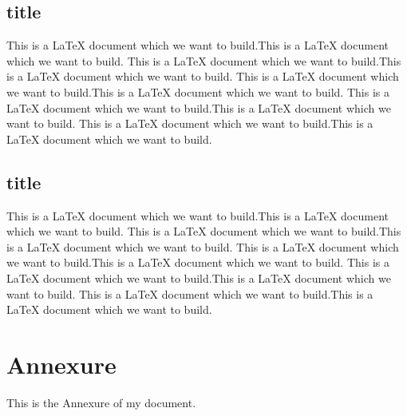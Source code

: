 \documentclass{book}
\begin{document}
    \section{title}
    This is a LaTeX document which we want to build.This is a LaTeX document which we want to build.
    This is a LaTeX document which we want to build.This is a LaTeX document which we want to build.
    This is a LaTeX document which we want to build.This is a LaTeX document which we want to build.
    This is a LaTeX document which we want to build.This is a LaTeX document which we want to build.
    This is a LaTeX document which we want to build.This is a LaTeX document which we want to build.
    \section{title}
    This is a LaTeX document which we want to build.This is a LaTeX document which we want to build.
    This is a LaTeX document which we want to build.This is a LaTeX document which we want to build.
    This is a LaTeX document which we want to build.This is a LaTeX document which we want to build.
    This is a LaTeX document which we want to build.This is a LaTeX document which we want to build.
    This is a LaTeX document which we want to build.This is a LaTeX document which we want to build.
    \chapter{Annexure}
    \setcounter{page}{1}
    This is the Annexure of my document.
\end{document}
